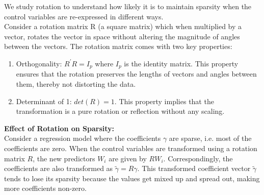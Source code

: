 We study rotation to understand how likely it is to maintain sparsity when the control variables are re-expressed in different ways. \\

Consider a rotation matrix R (a square matrix) which when multiplied by a vector, rotates the vector in space without altering the magnitude of angles between the vectors. The rotation matrix comes with two key properties:
\begin{enumerate}
    \item Orthogonality: $R^{\prime} R=I_p$ where $I_p$ is the identity matrix. This property ensures that the rotation preserves the lengths of vectors and angles between them, thereby not distorting the data. 
    \item Determinant of 1: $det(R) = 1$. This property implies that the transformation is a pure rotation or reflection without any scaling.
\end{enumerate}


\textbf{Effect of Rotation on Sparsity:}\\
Consider a regression model where the coefficients $\gamma$ are sparse, i.e. most of the coefficients are zero. When the control variables are transformed using a rotation matrix $R$, the new predictors $W_i$ are given by $RW_i$. Correspondingly, the coefficients are also transformed as $\tilde{\gamma}=R \gamma$. This transformed coefficient vector $\tilde{\gamma}$ tends to lose its sparsity because the values get mixed up and spread out, making more coefficients non-zero. 

